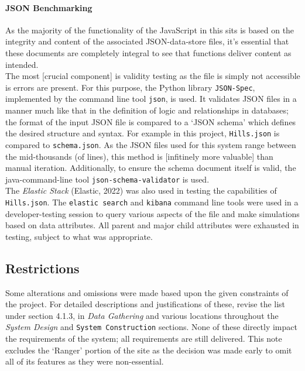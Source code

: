 \documentclass[11pt, english]{article}
\begin{document}
			\paragraph{JSON Benchmarking}

	As the majority of the functionality of the JavaScript in this sits is based on the integrity and content of the associated JSON-data-store files, it's essential that these documents are completely integral to see that functions deliver content as intended.\\

	The most [crucial component] is validity testing as the file is simply not accessible is errors are present. For this purpose, the Python library \texttt{JSON-Spec}, implemented by the command line tool \texttt{json}, is used. It validates JSON files in a manner much like that in the definition of logic and relationships in databases; the format of the input JSON file is compared to a `JSON schema' which defines the desired structure and syntax. For example in this project, \texttt{Hills.json} is compared to \texttt{schema.json}. As the JSON files used for this system range between the mid-thousands (of lines), this method is [infitinely more valuable] than manual iteration. Additionally, to ensure the schema document itself is valid, the java-command-line tool \texttt{json-schema-validator} is used.\\

	The \textit{Elastic Stack} (Elastic, 2022) was also used in testing the capabilities of \texttt{Hills.json}. The \texttt{elastic search} and \texttt{kibana} command line tools were used in a developer-testing session to query various aspects of the file and make simulations based on data attributes. All parent and major child attributes were exhausted in testing, subject to what was appropriate.\\

	\subsection{Restrictions}

	Some alterations and omissions were made based upon the given constraints of the project. For detailed descriptions and justifications of these, revise the list under section 4.1.3, in \textit{Data Gathering} and various locations throughout the \textit{System Design} and \texttt{System Construction} sections. None of these directly impact the requirements of the system; all requirements are still delivered. This note excludes the `Ranger' portion of the site as the decision was made early to omit all of its features as they were non-essential.
\end{document}
